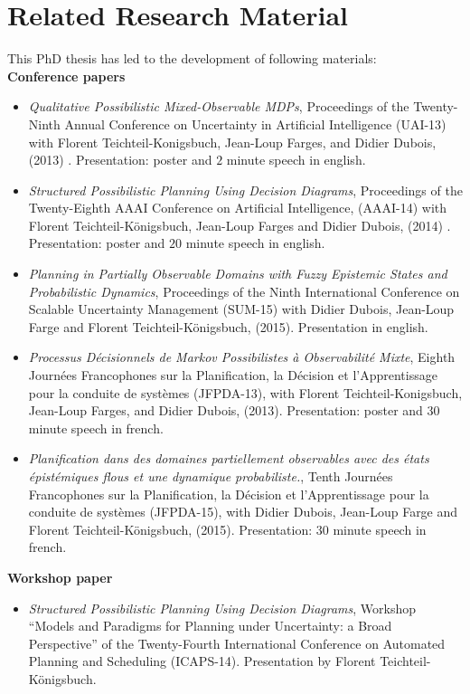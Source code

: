 \chapter*{Related Research Material}

This PhD thesis has led to the development of following materials:\\

\textbf{Conference papers}
\begin{itemize}
\item \textit{Qualitative {P}ossibilistic {M}ixed-{O}bservable {MDP}s}, 
Proceedings of the Twenty-Ninth Annual Conference on Uncertainty in Artificial Intelligence (UAI-13) 
with Florent Teichteil-Konigsbuch, Jean-Loup Farges, and Didier Dubois, (2013) \cite{Drougard13}. Presentation: poster and $2$ minute speech in english.
\item \textit{Structured Possibilistic Planning Using Decision Diagrams}, 
Proceedings of the Twenty-Eighth {AAAI} Conference on Artificial Intelligence,
(AAAI-14) with Florent Teichteil{-}K{\"{o}}nigsbuch, Jean-Loup Farges and Didier Dubois,
(2014) \cite{DBLP:conf/aaai/DrougardTFD14}. Presentation: poster and $20$ minute speech in english.
\item \textit{Planning in Partially Observable Domains with Fuzzy Epistemic States and Probabilistic Dynamics},
Proceedings of the Ninth International Conference on Scalable Uncertainty Management (SUM-15)
with Didier Dubois, Jean-Loup Farge and Florent Teichteil-K\"onigsbuch, (2015). Presentation in english.
\item \textit{Processus D\'ecisionnels de Markov Possibilistes \`a Observabilit\'e Mixte},
Eighth Journ\'ees Francophones sur la Planification, la D\'ecision et l'Apprentissage pour la conduite de syst\`emes (JFPDA-13),
with Florent Teichteil-Konigsbuch, Jean-Loup Farges, and Didier Dubois, (2013). Presentation: poster and $30$ minute speech in french.
\item \textit{Planification dans des domaines partiellement
observables avec des \'etats \'epist\'emiques flous
et une dynamique probabiliste.},
Tenth Journ\'ees Francophones sur la Planification, la D\'ecision et l'Apprentissage pour la conduite de syst\`emes (JFPDA-15),
with Didier Dubois, Jean-Loup Farge and Florent Teichteil-K\"onigsbuch, (2015). Presentation: $30$ minute speech in french.
\end{itemize}

\textbf{Workshop paper}
\begin{itemize}
\item \textit{Structured Possibilistic Planning Using Decision Diagrams}, 
Workshop ``Models and Paradigms for Planning under Uncertainty: a Broad Perspective'' 
of the Twenty-Fourth International Conference on Automated Planning and Scheduling (ICAPS-14).
Presentation by Florent Teichteil-K\"onigsbuch.
\end{itemize}

